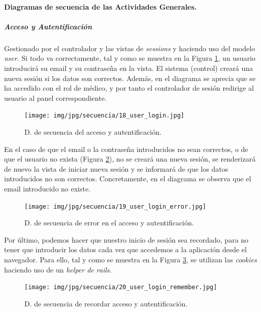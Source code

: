 \documentclass[a4paper,oneside,11pt]{book}
\begin{document}
			\paragraph{Diagramas de secuencia de las Actividades Generales.} %
			\label{par:diagramas_de_secuencia_de_las_actividades_generales_}
			
				\subparagraph{Acceso y Autentificación} %
				\label{subp:cont_acceso_y_autentificacion}
				
					Gestionado por el controlador y las vistas de \textit{sessions} y haciendo uso del modelo \textit{user.}
					Si todo va correctamente, tal y como se muestra en la Figura \ref{fig:cont_user_login}, un usuario introducirá su email y su contraseña en la vista. El sistema (control) creará una nueva sesión si los datos son correctos. Además, en el diagrama se aprecia que se ha accedido con el rol de médico, y por tanto el controlador de sesión redirige al usuario al panel correspondiente.
					
					\begin{figure}[H]
					  \centering
					    \texttt{[image: img/jpg/secuencia/18\_user\_login.jpg]}
					  \caption{D. de secuencia del acceso y autentificación.}
					  \label{fig:cont_user_login}
					\end{figure}
				
				En el caso de que el email o la contraseña introducidos no sean correctos, o de que el usuario no exista (Figura \ref{fig:cont_user_login_error}), no se creará una nueva sesión, se renderizará de nuevo la vista de iniciar nueva sesión y se informará de que los datos introducidos no son correctos. Concretamente, en el diagrama se observa que el email introducido no existe.
				
					\begin{figure}[H]
					  \centering
					    \texttt{[image: img/jpg/secuencia/19\_user\_login\_error.jpg]}
					  \caption{D. de secuencia de error en el acceso y autentificación.}
					  \label{fig:cont_user_login_error}
					\end{figure}
				
				Por último, podemos hacer que nuestro inicio de sesión sea recordado, para no tener que introducir los datos cada vez que accedemos a la aplicación desde el navegador. Para ello, tal y como se muestra en la Figura \ref{fig:cont_user_login_remember}, se utilizan las \textit{cookies} haciendo uso de un \textit{helper de rails}.
				
					\begin{figure}[H]
					  \centering
					    \texttt{[image: img/jpg/secuencia/20\_user\_login\_remember.jpg]}
					  \caption{D. de secuencia de recordar acceso y autentificación.}
					  \label{fig:cont_user_login_remember}
					\end{figure}
				
\end{document}
